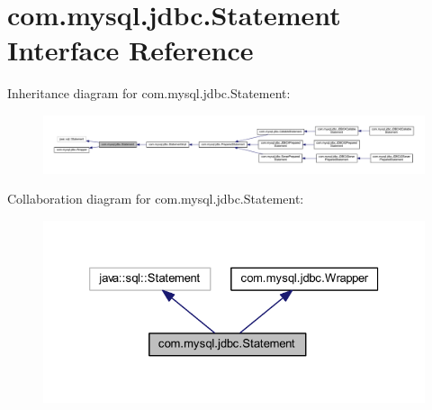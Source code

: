 \hypertarget{interfacecom_1_1mysql_1_1jdbc_1_1_statement}{}\section{com.\+mysql.\+jdbc.\+Statement Interface Reference}
\label{interfacecom_1_1mysql_1_1jdbc_1_1_statement}


Inheritance diagram for com.\+mysql.\+jdbc.\+Statement\+:
\nopagebreak
\begin{figure}[H]
\begin{center}
\leavevmode
\includegraphics[width=350pt]{interfacecom_1_1mysql_1_1jdbc_1_1_statement__inherit__graph}
\end{center}
\end{figure}


Collaboration diagram for com.\+mysql.\+jdbc.\+Statement\+:
\nopagebreak
\begin{figure}[H]
\begin{center}
\leavevmode
\includegraphics[width=326pt]{interfacecom_1_1mysql_1_1jdbc_1_1_statement__coll__graph}
\end{center}
\end{figure}
